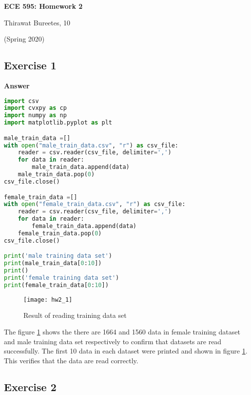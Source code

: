 \documentclass[11pt]{article}
\begin{document}
\begin{center}
\Large{\textbf{ECE 595: Homework 2}}

Thirawat Bureetes, 10

(Spring 2020)
\end{center}

\subsection*{Exercise 1}

\noindent\textbf{Answer}

\begin{lstlisting}[language=Python, showstringspaces=false]
import csv
import cvxpy as cp
import numpy as np
import matplotlib.pyplot as plt

male_train_data =[]
with open("male_train_data.csv", "r") as csv_file:
    reader = csv.reader(csv_file, delimiter=',')    
    for data in reader:
        male_train_data.append(data)        
    male_train_data.pop(0)   
csv_file.close()

female_train_data =[]
with open("female_train_data.csv", "r") as csv_file:    
    reader = csv.reader(csv_file, delimiter=',')    
    for data in reader:
        female_train_data.append(data)        
    female_train_data.pop(0)   
csv_file.close()

print('male training data set')
print(male_train_data[0:10])
print()
print('female training data set')
print(female_train_data[0:10])
\end{lstlisting}

\begin{figure}[H]
\centering
\texttt{[image: hw2\_1]}
\caption{Result of reading training data set}
\label{fig: hw2_1}
\end{figure}

The figure \ref{fig: hw2_1} shows the there are 1664 and 1560 data in female training dataset and male training data set respectively to confirm that datasets are read successfully. The first 10 data in each dataset were printed and shown in figure \ref{fig: hw2_1}. This verifies that the data are read correctly.

\subsection*{Exercise 2}
\end{document}
